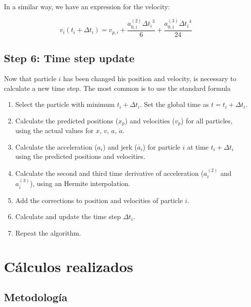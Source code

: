 \begin{appendixs}
	In a similar way, we have an expression for the velocity:
	
	\begin{equation}
		v_i(t_i + \Delta t_i) = v_{p, i} + \frac{a^{(2)}_{0, i} {\Delta t_i}^3}{6} + \frac{a^{(3)}_{0, i} {\Delta t_i}^4}{24} \label{eq:ap_vcorr}
	\end{equation}
	
	\subsection{Step 6: Time step update}
	
	Now that particle $i$ has been changed his position and velocity, is necessary to calculate a new time step. The most common is to use the standard formula \cite{aarseth1985}
	
	\begin{enumerate}
		\item Select the particle with minimum $t_i + \Delta t_i$. Set the global time as $t=t_i + \Delta t_i$.
		\item Calculate the predicted positions ($x_p$) and velocities ($v_p$) for all particles, using the actual values for $x$, $v$, $a$, $\dot{a}$. 
		\item Calculate the acceleration ($a_i$) and jerk ($\dot{a_i}$) for particle $i$ at time $t_i + \Delta t_i$ using the predicted positions and velocities.
		\item Calculate the second and third time derivative of acceleration ($a_i^{(2)}$ and $a_i^{(3)}$), using an Hermite interpolation.
		\item Add the corrections to position and velocities of particle $i$. 
		\item Calculate and update the time step $\Delta t_i$.
		\item Repeat the algorithm.
	\end{enumerate}
	
	\section{Cálculos realizados}

	\subsection{Metodología}
	\lipsum[1-2]



\end{appendixs}
